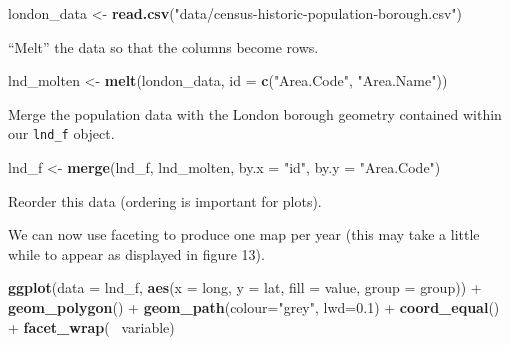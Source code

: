 \documentclass[]{article}
\newenvironment{Shaded}{}{}
\newcommand{\KeywordTok}[1]{\textcolor[rgb]{0.00,0.44,0.13}{\textbf{{#1}}}}
\newcommand{\DataTypeTok}[1]{\textcolor[rgb]{0.56,0.13,0.00}{{#1}}}
\newcommand{\FloatTok}[1]{\textcolor[rgb]{0.25,0.63,0.44}{{#1}}}
\newcommand{\StringTok}[1]{\textcolor[rgb]{0.25,0.44,0.63}{{#1}}}
\newcommand{\NormalTok}[1]{{#1}}
\begin{document}
\begin{Shaded}
\begin{Highlighting}[]
\NormalTok{london_data <-}\StringTok{ }\KeywordTok{read.csv}\NormalTok{(}\StringTok{"data/census-historic-population-borough.csv"}\NormalTok{)}
\end{Highlighting}
\end{Shaded}

``Melt'' the data so that the columns become rows.

\begin{Shaded}
\begin{Highlighting}[]
\NormalTok{lnd_molten <-}\StringTok{ }\KeywordTok{melt}\NormalTok{(london_data, }\DataTypeTok{id =} \KeywordTok{c}\NormalTok{(}\StringTok{"Area.Code"}\NormalTok{, }\StringTok{"Area.Name"}\NormalTok{))}
\end{Highlighting}
\end{Shaded}

Merge the population data with the London borough geometry contained
within our \texttt{lnd\_f} object.

\begin{Shaded}
\begin{Highlighting}[]
\NormalTok{lnd_f <-}\StringTok{ }\KeywordTok{merge}\NormalTok{(lnd_f, lnd_molten, }\DataTypeTok{by.x =} \StringTok{"id"}\NormalTok{, }\DataTypeTok{by.y =} \StringTok{"Area.Code"}\NormalTok{)}
\end{Highlighting}
\end{Shaded}

Reorder this data (ordering is important for plots).

\begin{Shaded}
\end{Shaded}

We can now use faceting to produce one map per year (this may take a
little while to appear as displayed in figure 13).

\begin{Shaded}
\begin{Highlighting}[]
\KeywordTok{ggplot}\NormalTok{(}\DataTypeTok{data =} \NormalTok{lnd_f, }\KeywordTok{aes}\NormalTok{(}\DataTypeTok{x =} \NormalTok{long, }\DataTypeTok{y =} \NormalTok{lat, }\DataTypeTok{fill =} \NormalTok{value, }\DataTypeTok{group =} \NormalTok{group)) +}
\StringTok{  }\KeywordTok{geom_polygon}\NormalTok{() +}
\StringTok{  }\KeywordTok{geom_path}\NormalTok{(}\DataTypeTok{colour=}\StringTok{"grey"}\NormalTok{, }\DataTypeTok{lwd=}\FloatTok{0.1}\NormalTok{) +}
\StringTok{  }\KeywordTok{coord_equal}\NormalTok{() +}
\StringTok{  }\KeywordTok{facet_wrap}\NormalTok{(~}\StringTok{ }\NormalTok{variable)}
\end{Highlighting}
\end{Shaded}
\end{document}
